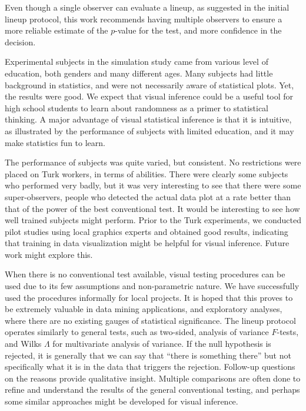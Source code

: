 \documentclass[12pt]{article}
\begin{document}

Even though a single observer can evaluate a lineup, as suggested in the initial lineup protocol, this work recommends having multiple observers to ensure a more reliable estimate of the $p$-value for the test, and more confidence in the decision.

Experimental subjects in the simulation study came from various level of education, both genders and many different ages. Many subjects had little background in statistics, and were not necessarily aware of statistical plots. Yet, the results were good. We expect that visual inference could be a useful tool for high school students to learn about randomness as a primer to statistical thinking. A major advantage of visual statistical inference is that it is intuitive, as illustrated by the performance of subjects with limited education, and it  may make statistics fun to learn. 

The performance of subjects was quite varied, but consistent. No restrictions were placed on Turk workers, in terms of abilities. There were clearly some subjects who performed very badly, but it was very interesting to see that there were some super-observers, people who detected the actual data plot at a rate better than that of the power of the best conventional test. 
 It would be interesting to see how well trained subjects might perform. Prior to the Turk experiments, we conducted pilot studies using local graphics experts and obtained good results, indicating that training in data visualization might be helpful for visual inference. Future work might explore this.


When there is no conventional test available, visual testing procedures can be used due to its few assumptions and non-parametric nature. We have successfully used the procedures informally for local projects. It is hoped that this proves to be extremely valuable in data mining applications, and exploratory analyses, where there are no existing gauges of statistical significance. The lineup protocol operates similarly to general tests, such as two-sided, analysis of variance $F$-tests, and Wilks $\Lambda$ for multivariate analysis of variance. If the null hypothesis is rejected, it is generally that we can say that ``there is something there'' but not specifically what it is in the data that triggers the rejection. Follow-up questions on the reasons provide qualitative insight. Multiple comparisons are often done to refine and understand the results of the general conventional testing, and perhaps some similar approaches might be developed for visual inference. 
\end{document}
